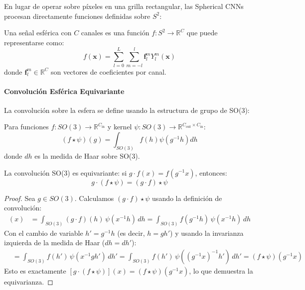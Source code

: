 En lugar de operar sobre píxeles en una grilla rectangular, las Spherical CNNs procesan directamente funciones definidas sobre $S^2$:

\begin{definition}
Una señal esférica con $C$ canales es una función $f: S^2 \to \mathbb{R}^C$ que puede representarse como:
\begin{equation}
f(\mathbf{x}) = \sum_{l=0}^{L} \sum_{m=-l}^{l} \mathbf{f}_l^m Y_l^m(\mathbf{x})
\end{equation}
donde $\mathbf{f}_l^m \in \mathbb{R}^C$ son vectores de coeficientes por canal.
\end{definition}

\paragraph{Convolución Esférica Equivariante}

La convolución sobre la esfera se define usando la estructura de grupo de SO(3):

\begin{definition}[Convolución SO(3)]
Para funciones $f: SO(3) \to \mathbb{R}^{C_{\text{in}}}$ y kernel $\psi: SO(3) \to \mathbb{R}^{C_{\text{out}} \times C_{\text{in}}}$:
\begin{equation}
(f \star \psi)(g) = \int_{SO(3)} f(h) \psi(g^{-1}h) dh
\end{equation}
donde $dh$ es la medida de Haar sobre SO(3).
\end{definition}

\begin{theorem}
La convolución SO(3) es equivariante: si $g \cdot f(x) = f(g^{-1}x)$, entonces:
\begin{equation}
g \cdot (f \star \psi) = (g \cdot f) \star \psi
\end{equation}
\end{theorem}

\begin{proof}
Sea $g \in SO(3)$. Calculamos $(g \cdot f) \star \psi$ usando la definición de convolución:
\begin{align}
[(g \cdot f) \star \psi](x) &= \int_{SO(3)} (g \cdot f)(h) \, \psi(x^{-1}h) \, dh = \int_{SO(3)} f(g^{-1}h) \, \psi(x^{-1}h) \, dh
\end{align}
Con el cambio de variable $h' = g^{-1}h$ (es decir, $h = gh'$) y usando la invarianza izquierda de la medida de Haar ($dh = dh'$):
\begin{align}
&= \int_{SO(3)} f(h') \, \psi(x^{-1}gh') \, dh' = \int_{SO(3)} f(h') \, \psi((g^{-1}x)^{-1}h') \, dh' = (f \star \psi)(g^{-1}x)
\end{align}
Esto es exactamente $[g \cdot (f \star \psi)](x) = (f \star \psi)(g^{-1}x)$, lo que demuestra la equivarianza.
\end{proof}


